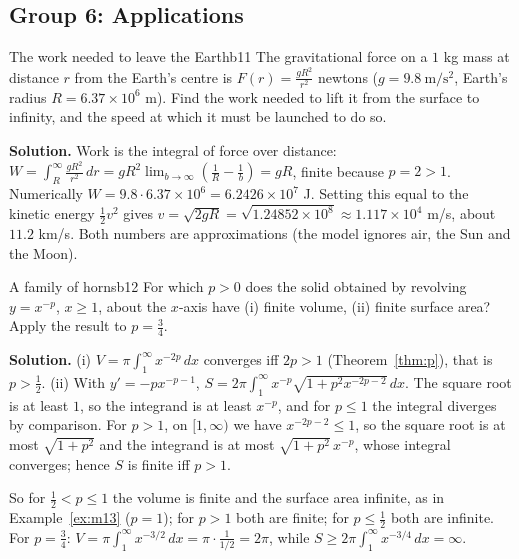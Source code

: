 \documentclass[11pt]{article}
\begin{document}
\subsection*{Group 6: Applications}

\begin{exmp}{The work needed to leave the Earth}{b11}
The gravitational force on a $1$ kg mass at distance $r$ from the Earth's centre is $F(r)=\frac{gR^2}{r^2}$ newtons ($g=9.8\ \mathrm{m/s^2}$, Earth's radius $R=6.37\times10^6$ m). Find the work needed to lift it from the surface to infinity, and the speed at which it must be launched to do so.

\textbf{Solution.} Work is the integral of force over distance: $W=\int_R^\infty\frac{gR^2}{r^2}\,dr=gR^2\lim_{b\to\infty}\left(\frac1R-\frac1b\right)=gR$, finite because $p=2>1$. Numerically $W=9.8\cdot6.37\times10^6=6.2426\times10^7$ J. Setting this equal to the kinetic energy $\frac12v^2$ gives $v=\sqrt{2gR}=\sqrt{1.24852\times10^8}\approx1.117\times10^4$ m/s, about $11.2$ km/s. Both numbers are approximations (the model ignores air, the Sun and the Moon).
\end{exmp}

\begin{exmp}{A family of horns}{b12}
For which $p>0$ does the solid obtained by revolving $y=x^{-p}$, $x\ge1$, about the $x$-axis have (i) finite volume, (ii) finite surface area? Apply the result to $p=\frac34$.

\textbf{Solution.} (i) $V=\pi\int_1^\infty x^{-2p}\,dx$ converges iff $2p>1$ (Theorem~\ref{thm:p}), that is $p>\frac12$. (ii) With $y'=-px^{-p-1}$, $S=2\pi\int_1^\infty x^{-p}\sqrt{1+p^2x^{-2p-2}}\,dx$. The square root is at least $1$, so the integrand is at least $x^{-p}$, and for $p\le1$ the integral diverges by comparison. For $p>1$, on $[1,\infty)$ we have $x^{-2p-2}\le1$, so the square root is at most $\sqrt{1+p^2}$ and the integrand is at most $\sqrt{1+p^2}\,x^{-p}$, whose integral converges; hence $S$ is finite iff $p>1$.

So for $\frac12<p\le1$ the volume is finite and the surface area infinite, as in Example~\ref{ex:m13} ($p=1$); for $p>1$ both are finite; for $p\le\frac12$ both are infinite. For $p=\frac34$: $V=\pi\int_1^\infty x^{-3/2}\,dx=\pi\cdot\frac{1}{1/2}=2\pi$, while $S\ge2\pi\int_1^\infty x^{-3/4}\,dx=\infty$.
\end{exmp}
\end{document}
